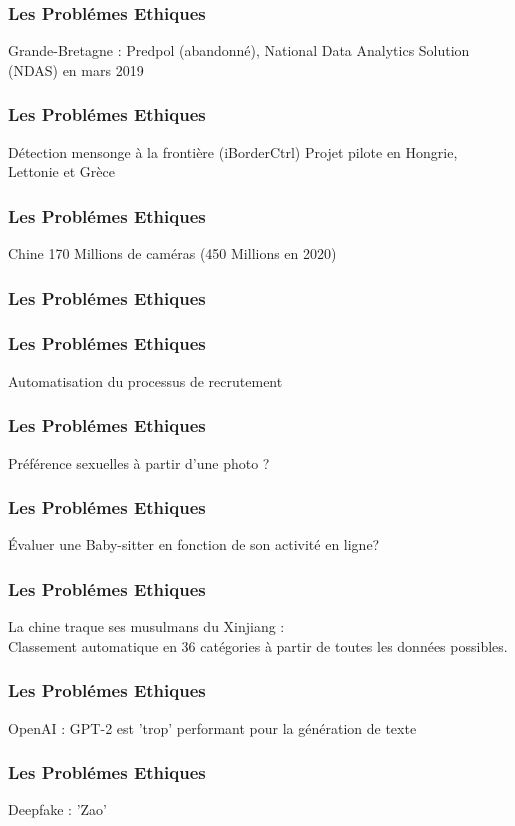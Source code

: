 \begin{frame}
  \frametitle{Les Problémes Ethiques}
  Grande-Bretagne : Predpol (abandonné),  National Data Analytics Solution (NDAS) en mars 2019
\end{frame}

\begin{frame}
  \frametitle{Les Problémes Ethiques}
  Détection mensonge à la frontière (iBorderCtrl)
  \newline
  Projet pilote en Hongrie, Lettonie et Grèce
\end{frame}

\begin{frame}
  \frametitle{Les Problémes Ethiques}
  Chine 170 Millions de caméras (450 Millions en 2020)
  \begin{minipage}[c]{0.49\linewidth}
  \end{minipage}\hfill
  \begin{minipage}[c]{0.49\linewidth}
  \end{minipage}\hfill
\end{frame}

\begin{frame}
  \frametitle{Les Problémes Ethiques}
\end{frame}

\begin{frame}
  \frametitle{Les Problémes Ethiques}
  Automatisation du processus de recrutement
\end{frame}

\begin{frame}
  \frametitle{Les Problémes Ethiques}
  Préférence sexuelles à partir d'une photo ?
\end{frame}

\begin{frame}
  \frametitle{Les Problémes Ethiques}
  Évaluer une Baby-sitter en fonction de son activité en ligne?
\end{frame}

\begin{frame}
  \frametitle{Les Problémes Ethiques}
  La chine traque ses musulmans du Xinjiang :\\
  Classement automatique en 36 catégories à partir de toutes les données possibles.
\end{frame}

\begin{frame}
  \frametitle{Les Problémes Ethiques}
  OpenAI : GPT-2 est 'trop' performant pour la génération de texte
\end{frame}

\begin{frame}
  \frametitle{Les Problémes Ethiques}
  Deepfake : 'Zao'
\end{frame}
